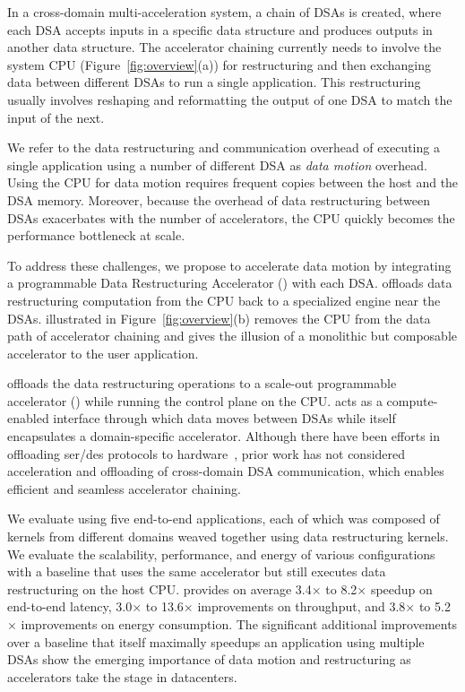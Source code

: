 In a cross-domain multi-acceleration system, a chain of DSAs is created, where each DSA accepts inputs in a specific data structure and produces outputs in another data structure. 
%
The accelerator chaining currently needs to involve the system CPU (Figure~\ref{fig:overview}(a)) for restructuring and then exchanging data between different DSAs to run a single application.
%
This restructuring usually involves reshaping and reformatting the output of one DSA to match the input of the next.
%

We refer to the data restructuring and communication overhead of executing a single application using a number of different DSA as \textit{data motion} overhead. %
%
Using the CPU for data motion requires frequent copies between the host and the DSA memory. 
%
Moreover, because the overhead of data restructuring between DSAs exacerbates with the number of accelerators, the CPU quickly becomes the performance bottleneck at scale.

To address these challenges, we propose \dmx to accelerate data motion by integrating a programmable Data Restructuring Accelerator (\drx) with each DSA.
%
\drx offloads data restructuring computation from the CPU back to a specialized engine near the DSAs.
%
\dmx illustrated in Figure~\ref{fig:overview}(b) removes the CPU from the data path of accelerator chaining and gives the illusion of a monolithic but composable accelerator to the user application. 

\dmx offloads the data restructuring operations to a scale-out programmable accelerator (\drx) while running the control plane on the CPU. 
%
\drx acts as a compute-enabled interface through which data moves between DSAs while \drx itself encapsulates a domain-specific accelerator. Although there have been efforts in offloading ser/des protocols to hardware~\cite{optimusprime:asplos:2020,protobuf:isca:2021}, prior work has not considered acceleration and offloading of cross-domain DSA communication, which enables efficient and seamless accelerator chaining.

We evaluate \dmx using five end-to-end applications, each of which was composed of kernels from different domains weaved together using data restructuring  kernels. 
%
%
We evaluate the scalability, performance, and energy of various \dmx configurations with a baseline that uses the same accelerator but still executes data restructuring on the host CPU.
%
\dmx provides on average 3.4$\times$ to 8.2$\times$ speedup on end-to-end latency, 3.0$\times$ to 13.6$\times$ improvements on throughput, and 3.8$\times$ to 5.2$\times$ improvements on energy consumption.
%
The significant additional improvements over a baseline that itself maximally speedups an application using multiple DSAs show the emerging importance of data motion and restructuring as accelerators take the stage in datacenters.

